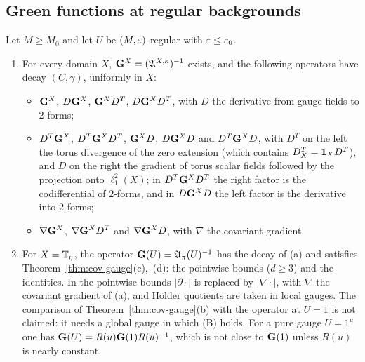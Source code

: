 \subsection{Green functions at regular backgrounds}

\begin{theorem}\label{thm:reg-gauge}
Let $M\ge M_0$ and let $U$ be $(M,\varepsilon)$-regular with $\varepsilon\le\varepsilon_0$.
\begin{enumerate}[label=(\alph*)]
\item For every domain $X$, $\mathbf G^X=(\mathfrak A^{X,\kappa})^{-1}$ exists, and the following operators have decay $(C,\gamma)$, uniformly in $X$:
  \begin{itemize}
  \item $\mathbf G^X$, $D\mathbf G^X$, $\mathbf G^XD^T$, $D\mathbf G^XD^T$, with $D$ the derivative from gauge fields to $2$-forms;
  \item $D^T\mathbf G^X$, $D^T\mathbf G^XD^T$, $\mathbf G^XD$, $D\mathbf G^XD$ and $D^T\mathbf G^XD$, with $D^T$ on the left the torus divergence of the zero extension (which contains $D^T_X=\mathbf 1_XD^T$), and $D$ on the right the gradient of torus scalar fields followed by the projection onto $\ell^2_1(X)$; in $D^T\mathbf G^XD^T$ the right factor is the codifferential of $2$-forms, and in $D\mathbf G^XD$ the left factor is the derivative into $2$-forms;
  \item $\nabla\mathbf G^X$, $\nabla\mathbf G^XD^T$ and $\nabla\mathbf G^XD$, with $\nabla$ the covariant gradient.
  \end{itemize}
\item For $X=\mathbb T_\eta$, the operator $\mathbf G(U)=\mathfrak A_\pi(U)^{-1}$ has the decay of (a) and satisfies Theorem~\ref{thm:cov-gauge}(c),~(d): the pointwise bounds ($d\ge3$) and the identities. In the pointwise bounds $|\partial\cdot|$ is replaced by $|\nabla\cdot|$, with $\nabla$ the covariant gradient of (a), and H\"older quotients are taken in local gauges. The comparison of Theorem~\ref{thm:cov-gauge}(b) with the operator at $U=1$ is not claimed: it needs a global gauge in which (B) holds. For a pure gauge $U=1^u$ one has $\mathbf G(U)=R(u)\mathbf G(1)R(u)^{-1}$, which is not close to $\mathbf G(1)$ unless $R(u)$ is nearly constant.
\end{enumerate}
\end{theorem}

